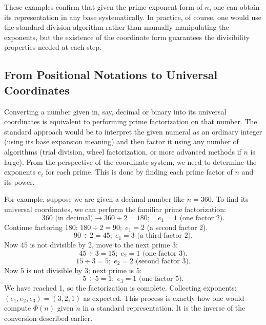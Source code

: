 \documentclass[11pt]{article}
\begin{document}
\begin{example}
\begin{itemize}
\end{itemize}
These examples confirm that given the prime-exponent form of $n$, one can obtain its representation in any base systematically. In practice, of course, one would use the standard division algorithm rather than manually manipulating the exponents, but the existence of the coordinate form guarantees the divisibility properties needed at each step.
\end{example}

\subsection*{From Positional Notations to Universal Coordinates}

Converting a number given in, say, decimal or binary into its universal coordinates is equivalent to performing prime factorization on that number. The standard approach would be to interpret the given numeral as an ordinary integer (using its base expansion meaning) and then factor it using any number of algorithms (trial division, wheel factorization, or more advanced methods if $n$ is large). From the perspective of the coordinate system, we need to determine the exponents $e_i$ for each prime. This is done by finding each prime factor of $n$ and its power.

For example, suppose we are given a decimal number like $n = 360$. To find its universal coordinates, we can perform the familiar prime factorization:
\[
360 \text{ (in decimal)} \rightarrow 360 \div 2 = 180; \quad e_1=1 \text{ (one factor 2)}.
\]
Continue factoring $180$: $180 \div 2 = 90; \; e_1=2$ (a second factor 2).
\[
90 \div 2 = 45; \; e_1=3 \text{ (a third factor 2)}.
\]
Now $45$ is not divisible by 2, move to the next prime $3$:
\[
45 \div 3 = 15; \; e_2=1 \text{ (one factor 3)}.
\]
\[
15 \div 3 = 5; \; e_2=2 \text{ (second factor 3)}.
\]
Now $5$ is not divisible by 3; next prime is $5$:
\[
5 \div 5 = 1; \; e_3=1 \text{ (one factor 5)}.
\]
We have reached 1, so the factorization is complete. Collecting exponents: $(e_1,e_2,e_3) = (3,2,1)$ as expected. This process is exactly how one would compute $\Phi(n)$ given $n$ in a standard representation. It is the inverse of the conversion described earlier.
\end{document}
